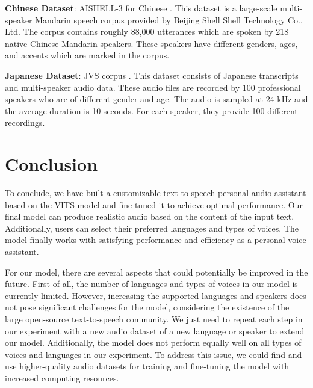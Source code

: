 \documentclass{article}
\begin{document}
\textbf{Chinese Dataset}: AISHELL-3 for Chinese \cite{AISHELL-3_2020}. This dataset is a large-scale multi-speaker Mandarin speech corpus provided by Beijing Shell Shell Technology Co., Ltd. The corpus contains roughly 88,000 utterances which are spoken by 218 native Chinese Mandarin speakers. These speakers have different genders, ages, and accents which are marked in the corpus.

\textbf{Japanese Dataset}: JVS corpus \cite{takamichi2019jvs}. This dataset consists of Japanese transcripts and multi-speaker audio data. These audio files are recorded by 100 professional speakers who are of different gender and age. The audio is sampled at 24 kHz and the average duration is 10 seconds. For each speaker, they provide 100 different recordings.



\section{Conclusion}
\label{sec:con}
To conclude, we have built a customizable text-to-speech personal audio assistant based on the VITS model and fine-tuned it to achieve optimal performance. Our final model can produce realistic audio based on the content of the input text. Additionally, users can select their preferred languages and types of voices. The model finally works with satisfying performance and efficiency as a personal voice assistant.

For our model, there are several aspects that could potentially be improved in the future. First of all, the number of languages and types of voices in our model is currently limited. However, increasing the supported languages and speakers does not pose significant challenges for the model, considering the existence of the large open-source text-to-speech community. We just need to repeat each step in our experiment with a new audio dataset of a new language or speaker to extend our model. Additionally, the model does not perform equally well on all types of voices and languages in our experiment. To address this issue, we could find and use higher-quality audio datasets for training and fine-tuning the model with increased computing resources.


  
 
\end{document}
